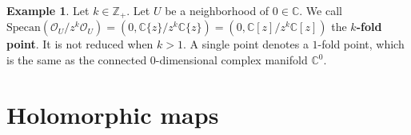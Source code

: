 \documentclass[12pt,b5paper,notitlepage]{report}
\theoremstyle{definition}
\newtheorem{eg}[df]{Example}
\theoremstyle{plain}
\newtheorem{pp}[df]{Proposition}
\newcommand{\fk}{\mathfrak}
\newcommand{\mc}{\mathcal}
\newcommand{\scr}{\mathscr}
\newcommand{\Cbb}{\mathbb C}
\newcommand{\Zbb}{\mathbb Z}
\newcommand{\cl}{\mathrm{cl}}
\newcommand{\Specan}{\mathrm{Specan}}
\numberwithin{equation}{section}
\begin{document}
\begin{eg}
Let $k\in\Zbb_+$. Let $U$ be a neighborhood of $0\in\Cbb$. We call $\Specan(\scr O_U/z^k\scr O_U)=(0,\Cbb\{z\}/z^k\Cbb\{z\})=(0,\Cbb[z]/z^k\Cbb[z])$ the \textbf{$k$-fold point}. It is not reduced when $k>1$. A single point denotes a $1$-fold point, which is the same as the connected $0$-dimensional complex manifold $\Cbb^0$.  
\end{eg}





















\section{Holomorphic maps}
\end{document}
